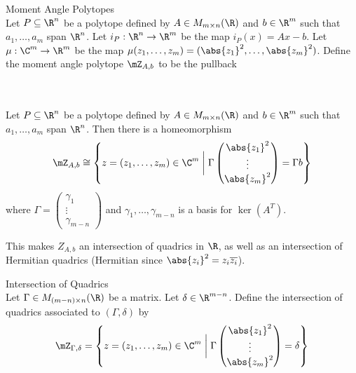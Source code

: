 \documentclass[a4paper]{article}
\begin{document}
\begin{defn}{Moment Angle Polytopes}{}\\
Let $P\subseteq\R^n$ be a polytope defined by $A\in M_{m\times n}(\R)$ and $b\in\R^m$ such that $a_1,\dots,a_m$ span $\R^n$. Let $i_P:\R^n\to\R^m$ be the map $i_P(x)=Ax-b$. Let $\mu:\C^m\to\R^m$ be the map $\mu(z_1,\dots,z_m)=(\abs{z_1}^2,\dots,\abs{z_m}^2)$. Define the moment angle polytope $\mZ_{A,b}$ to be the pullback \\
\\
\end{defn}

\begin{prp}{}{}\\
Let $P\subseteq\R^n$ be a polytope defined by $A\in M_{m\times n}(\R)$ and $b\in\R^m$ such that $a_1,\dots,a_m$ span $\R^n$. Then there is a homeomorphism $$\mZ_{A,b}\cong\left\{z=(z_1,\dots,z_m)\in\C^m\;\bigg{|}\;\Gamma\begin{pmatrix}
\abs{z_1}^2\\
\vdots\\
\abs{z_m}^2
\end{pmatrix}=\Gamma b\right\}$$ where $\Gamma=\begin{pmatrix}
\gamma_1\\
\vdots\\
\gamma_{m-n}\end{pmatrix}$ and $\gamma_1,\dots,\gamma_{m-n}$ is a basis for $\ker(A^T)$. 
\end{prp}

This makes $Z_{A,b}$ an intersection of quadrics in $\R$, as well as an intersection of Hermitian quadrics (Hermitian since $\abs{z_i}^2=z_i\overline{z_i}$). 

\begin{defn}{Intersection of Quadrics}{}\\
Let $\Gamma\in M_{(m-n)\times n}(\R)$ be a matrix. Let $\delta\in\R^{m-n}$. Define the intersection of quadrics associated to $(\Gamma,\delta)$ by $$\mZ_{\Gamma,\delta}=\left\{z=(z_1,\dots,z_m)\in\C^m\;\bigg{|}\;\Gamma\begin{pmatrix}
\abs{z_1}^2\\
\vdots\\
\abs{z_m}^2
\end{pmatrix}=\delta\right\}$$
\end{defn}
\end{document}
